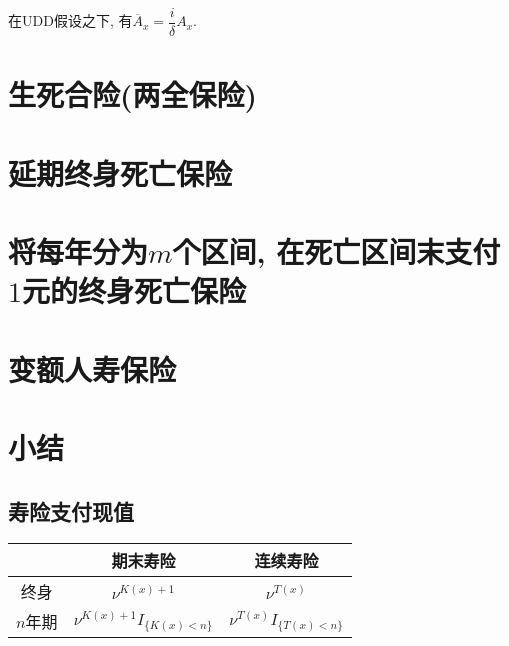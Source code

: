 \documentclass[lang=cn,10pt]{elegantbook}
\begin{document}
\begin{proposition}
	在UDD假设之下, 有$\overline A_x=\dfrac{i}{\delta}A_x$.
  \end{proposition}

\section{生死合险(两全保险)}

\section{延期终身死亡保险}

















\section{将每年分为$m$个区间, 在死亡区间末支付$1$元的终身死亡保险}

\section{变额人寿保险}

\section{小结}
\subsection{寿险支付现值}
\begin{center}
    \begin{tabular}{c|c|c}
        \hline
        & 期末寿险 & 连续寿险 \\
        \hline
        终身 & $\nu^{K(x)+1}$ & $\nu^{T(x)}$ \\
        \hline
        $n$年期 & $\nu^{K(x)+1}I_{\{K(x)<n\}}$ & $ \nu^{T(x)}I_{\{T(x)<n\}} $ \\
        \hline
    \end{tabular}
\end{center}
\end{document}

